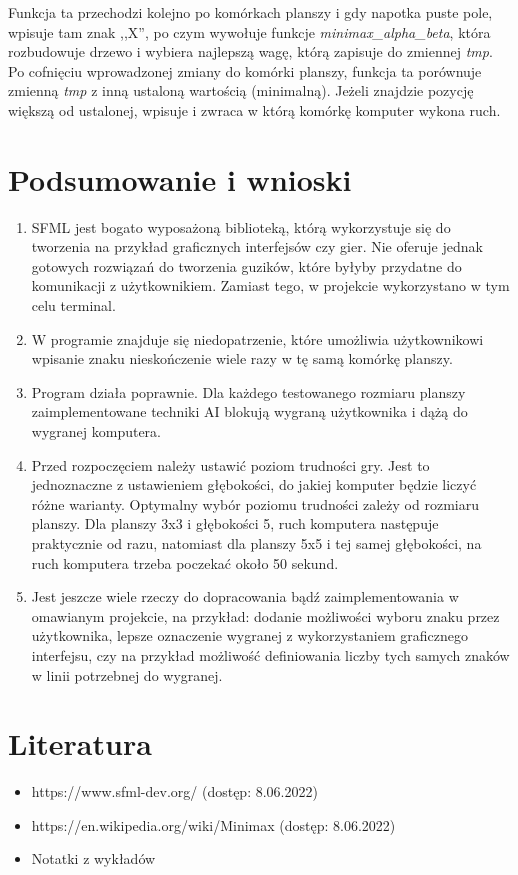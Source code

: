 \documentclass[12pt]{article}
\begin{document}
Funkcja ta przechodzi kolejno po komórkach planszy i gdy napotka puste pole, wpisuje tam znak ,,X'', po czym wywołuje funkcje \textit{minimax\_alpha\_beta}, która rozbudowuje drzewo i wybiera najlepszą wagę, którą zapisuje do zmiennej \textit{tmp}. Po cofnięciu wprowadzonej zmiany do komórki planszy, funkcja ta porównuje zmienną \textit{tmp} z inną ustaloną wartością (minimalną). Jeżeli znajdzie pozycję większą od ustalonej, wpisuje i zwraca w którą komórkę komputer wykona ruch.


\section{Podsumowanie i wnioski}
\begin{enumerate}
    \item SFML jest bogato wyposażoną biblioteką, którą wykorzystuje się do tworzenia na przykład graficznych interfejsów czy gier. Nie oferuje jednak gotowych rozwiązań do tworzenia guzików, które byłyby przydatne do komunikacji z użytkownikiem. Zamiast tego, w projekcie wykorzystano w tym celu terminal.
    \item W programie znajduje się niedopatrzenie, które umożliwia użytkownikowi wpisanie znaku nieskończenie wiele razy w tę samą komórkę planszy. 
    \item Program działa poprawnie. Dla każdego testowanego rozmiaru planszy zaimplementowane techniki AI blokują wygraną użytkownika i dążą do wygranej komputera.
    \item Przed rozpoczęciem należy ustawić poziom trudności gry. Jest to jednoznaczne z ustawieniem głębokości, do jakiej komputer będzie liczyć różne warianty. Optymalny wybór poziomu trudności zależy od rozmiaru planszy. Dla planszy 3x3 i głębokości 5, ruch komputera następuje praktycznie od razu, natomiast dla planszy 5x5 i tej samej głębokości, na ruch komputera trzeba poczekać około 50 sekund.
    \item Jest jeszcze wiele rzeczy do dopracowania bądź zaimplementowania w omawianym projekcie, na przykład: dodanie możliwości wyboru znaku przez użytkownika, lepsze oznaczenie wygranej z wykorzystaniem graficznego interfejsu, czy na przykład możliwość definiowania liczby tych samych znaków w linii potrzebnej do wygranej.
\end{enumerate}

\section{Literatura}
\begin{itemize}
    \item https://www.sfml-dev.org/ (dostęp: 8.06.2022)
    \item https://en.wikipedia.org/wiki/Minimax (dostęp: 8.06.2022)
    \item Notatki z wykładów
\end{itemize}
\end{document}
